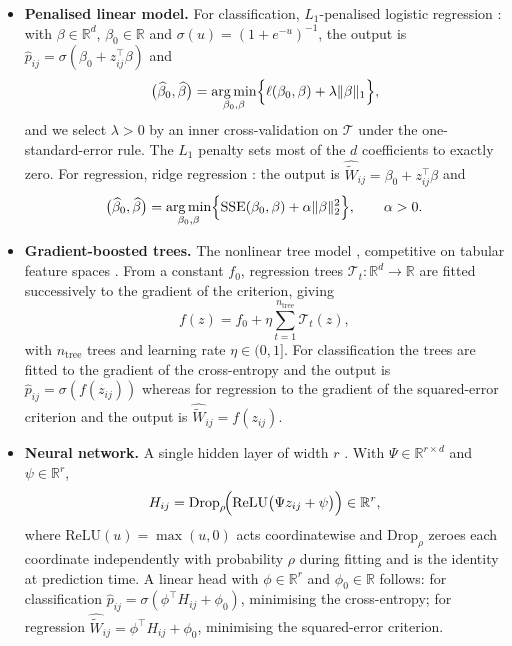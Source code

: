 \begin{itemize}

\item[--] \textbf{Penalised linear model.} For classification, \(L_{1}\)-penalised logistic regression
\citep{tibshirani1996}: with \(\beta\in\mathbb{R}^{d}\), \(\beta_{0}\in\mathbb{R}\) and
\(\sigma(u)=(1+e^{-u})^{-1}\), the output is \(\widehat p_{ij}=\sigma(\beta_{0}+z_{ij}^{\top}\beta)\) and
\begin{equation}\label{eq:lasso}
 \bigl(\widehat\beta_{0},\widehat\beta\bigr)
 =\operatorname*{arg\,min}_{\beta_{0},\beta}
 \Bigl\{\ell(\beta_{0},\beta)+\lambda\lVert\beta\rVert_{1}\Bigr\},
\end{equation}
and we select \(\lambda>0\) by an inner cross-validation on \(\mathcal{T}\) under the one-standard-error
rule. The \(L_{1}\) penalty sets most of the \(d\) coefficients to exactly zero. For regression, ridge 
regression \citep{hoerl1970}: the output is \(\widehat{\widetilde W}_{ij}=\beta_{0}+z_{ij}^{\top}\beta\) and
\begin{equation}\label{eq:ridge}
 \bigl(\widehat\beta_{0},\widehat\beta\bigr)
 =\operatorname*{arg\,min}_{\beta_{0},\beta}
 \Bigl\{\mathrm{SSE}(\beta_{0},\beta)+\alpha\lVert\beta\rVert_{2}^{2}\Bigr\},
 \qquad \alpha>0.
\end{equation}

\item[--] \textbf{Gradient-boosted trees.} The nonlinear tree model \citep{chen2016}, competitive on tabular feature
spaces \citep{grinsztajn2022}. From a constant \(f_{0}\), regression trees
\(\mathcal{T}_{t}:\mathbb{R}^{d}\to\mathbb{R}\) are fitted successively to the gradient of the criterion,
giving
\begin{equation}\label{eq:xgb}
 f(z)=f_{0}+\eta\sum_{t=1}^{n_{\mathrm{tree}}}\mathcal{T}_{t}(z),
\end{equation}
with \(n_{\mathrm{tree}}\) trees and learning rate \(\eta\in(0,1]\). For classification the trees are fitted to the gradient 
of the cross-entropy and the output is
\(\widehat p_{ij}=\sigma(f(z_{ij}))\) whereas for regression to the gradient of the squared-error criterion
and the output is \(\widehat{\widetilde W}_{ij}=f(z_{ij})\).

\item[--] \textbf{Neural network.} A single hidden layer of width \(r\) \citep{Bishop2006}. With
\(\Psi\in\mathbb{R}^{r\times d}\) and \(\psi\in\mathbb{R}^{r}\),
\begin{equation}\label{eq:mlp}
 H_{ij}=\mathrm{Drop}_{\rho}\!\Bigl(\mathrm{ReLU}\bigl(\Psi z_{ij}+\psi\bigr)\Bigr)\in\mathbb{R}^{r},
\end{equation}
where \(\mathrm{ReLU}(u)=\max(u,0)\) acts coordinatewise and \(\mathrm{Drop}_{\rho}\) zeroes each
coordinate independently with probability \(\rho\) during fitting and is the identity at prediction time.
A linear head with \(\phi\in\mathbb{R}^{r}\) and \(\phi_{0}\in\mathbb{R}\) follows: for classification
\(\widehat p_{ij}=\sigma(\phi^{\top}H_{ij}+\phi_{0})\), minimising the cross-entropy; for regression
\(\widehat{\widetilde W}_{ij}=\phi^{\top}H_{ij}+\phi_{0}\), minimising the squared-error criterion.

\end{itemize}
